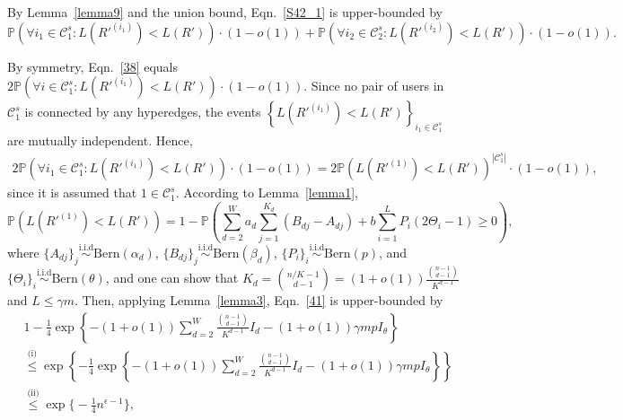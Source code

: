 \documentclass{article}
\begin{document}
By Lemma~\ref{lemma9} and the union bound, Eqn.~\eqref{S42_1} is upper-bounded by
\begin{equation}\label{38}
	\mathbb{P} \left( \forall  i_1 \in \mathcal{C}_1^s: L ( R'^{(i_1)} ) < L(R')  \right) \cdot (1-o(1)) + \mathbb{P} \left( \forall  i_2 \in \mathcal{C}_2^s: L ( R'^{(i_2)} ) < L(R')  \right) \cdot (1-o(1)).
\end{equation}

By symmetry, Eqn.~\eqref{38} equals $ 2 \mathbb{P} \left( \forall  i \in \mathcal{C}_1^s: L ( R'^{(i_1)} ) < L(R')  \right) \cdot (1-o(1)) $. Since no pair of users in $\mathcal{C}_1^s$ is connected by any hyperedges, the events $\left\{  L ( R'^{(i_1)} ) < L(R') \right\}_{i_1 \in \mathcal{C}_1^s}$ are mutually independent. Hence,
\begin{equation}\label{39}
	\begin{aligned}
		2 \mathbb{P} \left( \forall  i_1 \in \mathcal{C}_1^s: L ( R'^{(i_1)} ) < L(R')  \right) \cdot (1-o(1)) = 2 \mathbb{P} \left( L(R'^{(1)}) < L(R') \right)^{|\mathcal{C}_1^s|} \cdot (1-o(1)),
	\end{aligned}
\end{equation}
since it is assumed that $1 \in \mathcal{C}_1^s$. According to Lemma~\ref{lemma1}, 
\begin{equation}\label{41}
\mathbb{P} \left( L(R'^{(1)}) < L(R') \right) = 1 -	\mathbb{P} \left( \sum_{d=2}^{W} a_d  \sum_{j=1}^{K_d} (B_{dj} - A_{dj}) + b \sum_{i=1}^{L}P_i(2\Theta_i - 1) \geq 0  \right), 
\end{equation}
where $\{A_{dj}\}_j \overset{\text{i.i.d}}{\sim} \text{Bern}(\alpha_d)$, $\{B_{dj}\}_j \overset{\text{i.i.d}}{\sim} \text{Bern}(\beta_d)$, $\{P_{i}\}_i \overset{\text{i.i.d}}{\sim} \text{Bern}(p)$, and $\{\Theta_{i}\}_i \overset{\text{i.i.d}}{\sim} \text{Bern}(\theta)$, and one can show that $K_d =   \binom{n/K - 1}{d - 1} = (1+ o(1)) \frac{\binom{n-1}{d -1 }}{K^{d-1}}  $ and $L \leq \gamma m$. Then, applying Lemma~\ref{lemma3}, Eqn.~\eqref{41} is upper-bounded by
\begin{equation}\label{42}
\begin{aligned}
    & 1 - \frac{1}{4} \exp \left\{ -(1+o(1)) \sum_{d=2}^{W} \frac{\binom{n-1}{d-1}}{K^{d-1}} I_d - (1+o(1))\gamma m p I_\theta \right\} \\
    & \overset{\text{(i)}}{\leq} \exp \left\{ - \frac{1}{4} \exp \left\{ -(1+o(1)) \sum_{d=2}^{W} \frac{\binom{n-1}{d-1}}{K^{d-1}} I_d - (1+o(1))\gamma m p I_\theta \right\} \right\} \\
    &\overset{\text{(ii)}}{\leq} \exp \Big\{ - \frac{1}{4} n^{\epsilon-1}  \Big\},
\end{aligned}
\end{equation}
\end{document}
